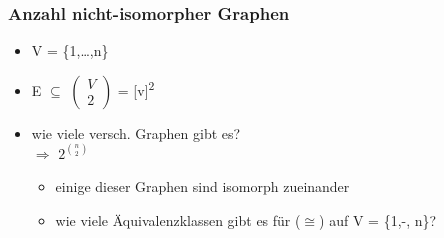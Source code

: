 \subsubsection{Anzahl nicht-isomorpher Graphen}
\begin{itemize}
	\item V = \{1,\ldots,n\}
	\item E $\subseteq$ $\left(\begin{array}{c} V \\ 2 \end{array}\right)$ = [v]\textsuperscript{2}
	\item wie viele versch. Graphen gibt es?\\ $\Rightarrow$ $2^{\binom{n}{2}}$
	\begin{itemize}
		\item einige dieser Graphen sind isomorph zueinander
		\item wie viele Äquivalenzklassen gibt es für ($\cong$) auf V = \{1,-, n\}?
	\end{itemize}
\end{itemize}

